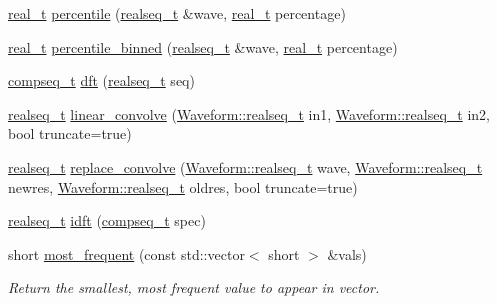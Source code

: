 \begin{DoxyCompactItemize}
\hyperlink{namespace_wire_cell_1_1_waveform_a47570354e4599d8387803188186aba1f}{real\+\_\+t} \hyperlink{namespace_wire_cell_1_1_waveform_a9116b8ebe848721a04d5100fa672b0aa}{percentile} (\hyperlink{namespace_wire_cell_1_1_waveform_a479175e541c8545e87cd8063b74b6956}{realseq\+\_\+t} \&wave, \hyperlink{namespace_wire_cell_1_1_waveform_a47570354e4599d8387803188186aba1f}{real\+\_\+t} percentage)
\item 
\hyperlink{namespace_wire_cell_1_1_waveform_a47570354e4599d8387803188186aba1f}{real\+\_\+t} \hyperlink{namespace_wire_cell_1_1_waveform_ae080d239c8b4426a6d74f9fd8ce85f1a}{percentile\+\_\+binned} (\hyperlink{namespace_wire_cell_1_1_waveform_a479175e541c8545e87cd8063b74b6956}{realseq\+\_\+t} \&wave, \hyperlink{namespace_wire_cell_1_1_waveform_a47570354e4599d8387803188186aba1f}{real\+\_\+t} percentage)
\item 
\hyperlink{namespace_wire_cell_1_1_waveform_a7e4a8d371f774438bb360e7d1dcb583a}{compseq\+\_\+t} \hyperlink{namespace_wire_cell_1_1_waveform_a6cfae9f74c1bf06f69d6991f3f82cef5}{dft} (\hyperlink{namespace_wire_cell_1_1_waveform_a479175e541c8545e87cd8063b74b6956}{realseq\+\_\+t} seq)
\item 
\hyperlink{namespace_wire_cell_1_1_waveform_a479175e541c8545e87cd8063b74b6956}{realseq\+\_\+t} \hyperlink{namespace_wire_cell_1_1_waveform_aafc9307577968266045319c91ce3ab66}{linear\+\_\+convolve} (\hyperlink{namespace_wire_cell_1_1_waveform_a479175e541c8545e87cd8063b74b6956}{Waveform\+::realseq\+\_\+t} in1, \hyperlink{namespace_wire_cell_1_1_waveform_a479175e541c8545e87cd8063b74b6956}{Waveform\+::realseq\+\_\+t} in2, bool truncate=true)
\item 
\hyperlink{namespace_wire_cell_1_1_waveform_a479175e541c8545e87cd8063b74b6956}{realseq\+\_\+t} \hyperlink{namespace_wire_cell_1_1_waveform_abd675d86a770025f3ace47b277bf0e0e}{replace\+\_\+convolve} (\hyperlink{namespace_wire_cell_1_1_waveform_a479175e541c8545e87cd8063b74b6956}{Waveform\+::realseq\+\_\+t} wave, \hyperlink{namespace_wire_cell_1_1_waveform_a479175e541c8545e87cd8063b74b6956}{Waveform\+::realseq\+\_\+t} newres, \hyperlink{namespace_wire_cell_1_1_waveform_a479175e541c8545e87cd8063b74b6956}{Waveform\+::realseq\+\_\+t} oldres, bool truncate=true)
\item 
\hyperlink{namespace_wire_cell_1_1_waveform_a479175e541c8545e87cd8063b74b6956}{realseq\+\_\+t} \hyperlink{namespace_wire_cell_1_1_waveform_a69255dad704fcb71fa53745e90a2f0e1}{idft} (\hyperlink{namespace_wire_cell_1_1_waveform_a7e4a8d371f774438bb360e7d1dcb583a}{compseq\+\_\+t} spec)
\item 
short \hyperlink{namespace_wire_cell_1_1_waveform_a86192f53532ba1e28516c2f8f3a9fa44}{most\+\_\+frequent} (const std\+::vector$<$ short $>$ \&vals)
\begin{DoxyCompactList}\small\item\em Return the smallest, most frequent value to appear in vector. \end{DoxyCompactList}\end{DoxyCompactItemize}



